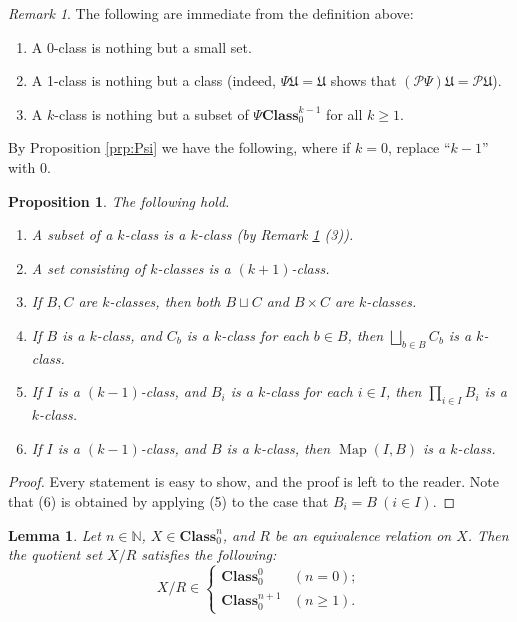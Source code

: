 \documentclass{surv-l}
\numberwithin{equation}{chapter}
\numberwithin{figure}{chapter}
\theoremstyle{plain}
\newtheorem{lem}[thm]{Lemma}
\newtheorem{prp}[thm]{Proposition}
\theoremstyle{definition}
\theoremstyle{remark}
\newtheorem{rmk}[thm]{Remark}
\DeclareMathOperator{\Map}{Map}
\begin{document}
\begin{rmk}\label{rmk:k-class-imi}
The following are immediate from the definition above:
\begin{enumerate}
\item
A 0-class is nothing but a small set.
\item
A 1-class is nothing but a class (indeed, $\Psi \mathfrak{U} = \mathfrak{U}$ shows that $(\mathcal{P}\Psi)\mathfrak{U} = \mathcal{P}\mathfrak{U}$).
\item
A $k$-class is nothing but a subset of $\Psi\mathbf{Class}^{k-1}_0$ for all $k \ge 1$.
\end{enumerate}
\end{rmk}

By Proposition \ref{prp:Psi} we have the following, where
if $k = 0$, replace ``$k - 1$'' with 0.

\begin{prp}\label{prp:k-class}
The following hold.
\begin{enumerate}
\item
A subset of a $k$-class is a $k$-class {\rm (by Remark \ref{rmk:k-class-imi} (3))}.
\item
A set consisting of $k$-classes is a $(k+1)$-class.
\item
If $B, C$ are $k$-classes, then both $B \sqcup C$ and $B \times C$ are $k$-classes.
\item
If $B$ is a $k$-class, and $C_b$ is a $k$-class for each $b \in B$,
then $\bigsqcup_{b \in B}C_b$ is a $k$-class.
\item
If $I$ is a $(k-1)$-class, and $B_i$ is a $k$-class for each $i \in I$,
then $\prod_{i\in I}B_i$ is a $k$-class.
\item
If $I$ is a $(k-1)$-class, and $B$ is a $k$-class, then
$\Map(I, B)$ is a $k$-class.

\end{enumerate}
\end{prp}

\begin{proof}
Every statement is easy to show, and the proof is left to the reader.
Note that (6) is obtained by applying (5)
to the case that $B_i = B\ (i \in I)$.
\end{proof}

\begin{lem}\label{lem:quotient-set}
Let $n \in \mathbb{N}$, $X \in \mathbf{Class}_0^n$, and $R$ be an equivalence relation on $X$.
Then the quotient set $X/R$ satisfies the following:
\[
X/R \in
\begin{cases}
\mathbf{Class}_0^0 & (n = 0);\\
 \mathbf{Class}_0^{n+1} & (n \ge 1).
\end{cases}
\]
\end{lem}
\end{document}
